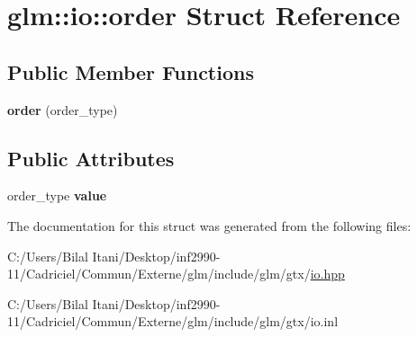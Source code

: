 \hypertarget{structglm_1_1io_1_1order}{}\section{glm\+:\+:io\+:\+:order Struct Reference}
\label{structglm_1_1io_1_1order}
\subsection*{Public Member Functions}
\begin{DoxyCompactItemize}
\item 
{\bfseries order} (order\+\_\+type)\hypertarget{structglm_1_1io_1_1order_a06813d404c975865fdd3a77146268a1f}{}\label{structglm_1_1io_1_1order_a06813d404c975865fdd3a77146268a1f}

\end{DoxyCompactItemize}
\subsection*{Public Attributes}
\begin{DoxyCompactItemize}
\item 
order\+\_\+type {\bfseries value}\hypertarget{structglm_1_1io_1_1order_aa8788dd0568bacd081d02bd5aca9889b}{}\label{structglm_1_1io_1_1order_aa8788dd0568bacd081d02bd5aca9889b}

\end{DoxyCompactItemize}


The documentation for this struct was generated from the following files\+:\begin{DoxyCompactItemize}
\item 
C\+:/\+Users/\+Bilal Itani/\+Desktop/inf2990-\/11/\+Cadriciel/\+Commun/\+Externe/glm/include/glm/gtx/\hyperlink{io_8hpp}{io.\+hpp}\item 
C\+:/\+Users/\+Bilal Itani/\+Desktop/inf2990-\/11/\+Cadriciel/\+Commun/\+Externe/glm/include/glm/gtx/io.\+inl\end{DoxyCompactItemize}
